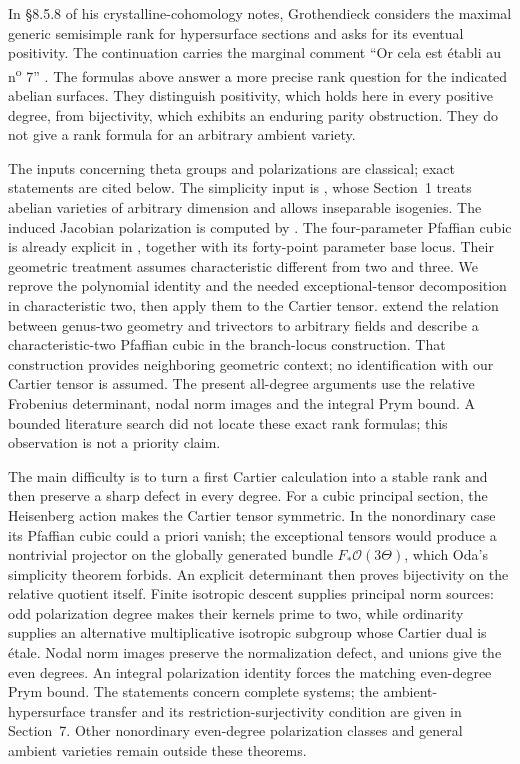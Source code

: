 \documentclass[11pt]{article}
\theoremstyle{definition}\newtheorem{definition}[theorem]{Definition}
\theoremstyle{remark}\newtheorem{remark}[theorem]{Remark}
\newcommand{\OO}{\mathcal O}
\begin{document}
In \S8.5.8 of his crystalline-cohomology notes, Grothendieck considers the maximal generic semisimple rank for hypersurface sections and asks for its eventual positivity. The continuation carries the marginal comment ``Or cela est \'etabli au n\textsuperscript{o} 7'' \citep[cote~4, archive sheets~7--8, PDF images~8--9]{Grothendieck}. The formulas above answer a more precise rank question for the indicated abelian surfaces. They distinguish positivity, which holds here in every positive degree, from bijectivity, which exhibits an enduring parity obstruction. They do not give a rank formula for an arbitrary ambient variety.

The inputs concerning theta groups and polarizations are classical; exact statements are cited below. The simplicity input is \citet[Theorem~1.2(i), p.~45]{Oda}, whose Section~1 treats abelian varieties of arbitrary dimension and allows inseparable isogenies. The induced Jacobian polarization is computed by \citet[\S3, equations~(3.2)--(3.3), pp.~346--347]{Debarre}. The four-parameter Pfaffian cubic is already explicit in \citet[equation~(3.9), author version p.~14; \S3.4, pp.~17--18]{GrusonSam}, together with its forty-point parameter base locus. Their geometric treatment assumes characteristic different from two and three. We reprove the polynomial identity and the needed exceptional-tensor decomposition in characteristic two, then apply them to the Cartier tensor. \citet[Theorem~5.1, p.~340; Remark~5.8, p.~342]{RainsSam} extend the relation between genus-two geometry and trivectors to arbitrary fields and describe a characteristic-two Pfaffian cubic in the branch-locus construction. That construction provides neighboring geometric context; no identification with our Cartier tensor is assumed. The present all-degree arguments use the relative Frobenius determinant, nodal norm images and the integral Prym bound. A bounded literature search did not locate these exact rank formulas; this observation is not a priority claim.

The main difficulty is to turn a first Cartier calculation into a stable rank and then preserve a sharp defect in every degree. For a cubic principal section, the Heisenberg action makes the Cartier tensor symmetric. In the nonordinary case its Pfaffian cubic could a priori vanish; the exceptional tensors would produce a nontrivial projector on the globally generated bundle $F_*\OO(3\Theta)$, which Oda's simplicity theorem forbids. An explicit determinant then proves bijectivity on the relative quotient itself. Finite isotropic descent supplies principal norm sources: odd polarization degree makes their kernels prime to two, while ordinarity supplies an alternative multiplicative isotropic subgroup whose Cartier dual is \'etale. Nodal norm images preserve the normalization defect, and unions give the even degrees. An integral polarization identity forces the matching even-degree Prym bound. The statements concern complete systems; the ambient-hypersurface transfer and its restriction-surjectivity condition are given in Section~7. Other nonordinary even-degree polarization classes and general ambient varieties remain outside these theorems.
\end{document}
